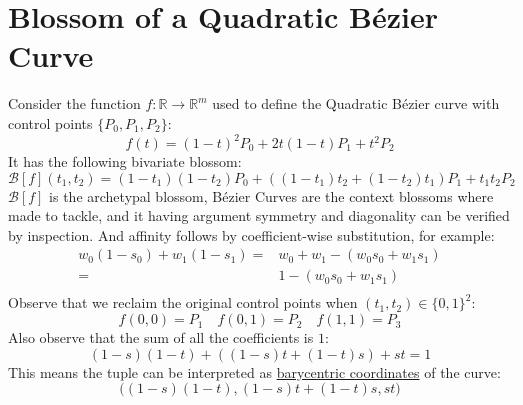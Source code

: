 
\section{Blossom of a Quadratic Bézier Curve}
Consider the function $f:\mathbb{R}\rightarrow\mathbb{R}^m$ used to define the  Quadratic Bézier curve with control points $\{P_0,P_1,P_2\}$:
\[f(t)=(1-t)^2P_0+2t(1-t)P_1+t^2P_2\]
It has the following bivariate blossom:
\[\mathcal{B}[f](t_1,t_2) = (1-t_1)(1-t_2)P_0+((1-t_1)t_2+(1-t_2)t_1)P_1+t_1t_2P_2\]
$\mathcal{B}[f]$ is the archetypal blossom,
Bézier Curves are the context blossoms where made to tackle,
and it having argument symmetry and diagonality can be verified by inspection.
And affinity follows by coefficient-wise substitution, for example:
\[\begin{aligned}
	w_0(1-s_0)+w_1(1-s_1)=& w_0+w_1-(w_0s_0+w_1s_1)\\
	=&1-(w_0s_0+w_1s_1)\\
\end{aligned}\]
Observe that we reclaim the original control points when $(t_1,t_2)\in\{0,1\}^2$:
\[
	f(0,0) = P_1\quad
	f(0,1) = P_2\quad
	f(1,1) = P_3
\]
Also observe that the sum of all the coefficients is $1$:
\[(1-s)(1-t)+((1-s)t+(1-t)s)+st = 1\]
This means the tuple can be interpreted as \hyperref[appx:bary]{barycentric coordinates} of the curve:
\[\big((1-s)(1-t),(1-s)t+(1-t)s,st\big)\]

